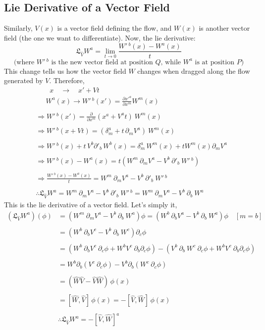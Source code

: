 \documentclass[14pt]{article} %
\begin{document}
\subsection{Lie Derivative of a Vector Field}
Similarly, $V(x)$ is a vector field defining the flow, and $W(x)$ is another vector field (the one we want to differentiate). Now, the lie derivative:
\[
\mathfrak{L}_{\hat{V}} W^a = \lim_{t \to 0} \frac{W'\,^b(x) - W^a(x)}{t}
\]
\[
\text{(where $W'\,^b$ is the new vector field at position $Q$, while $W^a$ is at position $P$)}
\]
This change tells us how the vector field $W$ changes when dragged along the flow generated by $V$. Therefore,
\begin{align*}
& \quad \quad x \quad \rightarrow \quad x' + Vt \\
& \quad ~~W^a(x) \rightarrow W'\,^b(x') = \frac{\partial x'^a}{\partial x^m} W^m(x) \\\\
& \Rightarrow W'\,^b(x') = \frac{\partial}{\partial x^m}(x^a + V^a t)~W^m(x) \\\\
& \Rightarrow W'\,^b(x + Vt) = \left( \delta^a_m + t\,\partial_m V^a \right)~W^m(x) \\\\
& \Rightarrow W'\,^b(x)+ t\,V^b \partial'_b\,W^b(x) = \delta^a_m\,W^m(x) + t W^m(x) \partial_m V^a \\\\
& \Rightarrow W'\,^b(x) - W^a(x) = t \left(W^m~\partial_m V^a - V^b~ \partial'_b ~W'\,^b \right) \\\\
& \Rightarrow \frac{W'\,^b(x) - W^a(x)}{t} = W^m~\partial_m V^a - V^b~ \partial'_b ~W'\,^b \\\\
&  \boxed{\therefore \mathfrak{L}_{\hat{V}} W^a = W^m~\partial_m V^a - V^b~ \partial'_b ~W'\,^b = W^m~\partial_m V^a - V^b~ \partial_b ~W^a}
\end{align*}
This is the lie derivative of a vector field. Let's simply it,
\begin{align*}
(\mathfrak{L}_{\hat{V}} W^a)(\phi) & = (W^m~\partial_m V^a - V^b~ \partial_b ~W^a)\phi= (W^b~\partial_b V^a - V^b~ \partial_b ~W^a) \phi \quad[m=b] \\\\
& = (W^b~\partial_b V^c - V^b~ \partial_b ~W^c) \partial_c \phi \\\\
&= (W^b~\partial_b V^c ~\partial_c \phi + W^b V^c~\partial_b \partial_c \phi) - (V^b~ \partial_b ~W^c~\partial_c \phi + W^b V^c~\partial_b \partial_c \phi) \\\\
&= W^b \partial_b (V^c ~ \partial_c \phi) - V^b \partial_b (W^c ~ \partial_c \phi) \\\\
& = ( \hat{W} \hat{V} - \hat{V} \hat{W})\, \phi(x) \\\\
& =[ \hat{W}, \hat{V} ]\, \phi(x) = -[ \hat{V}, \hat{W} ]\, \phi(x)\\\\
& \boxed{\therefore \mathfrak{L}_{\hat{V}} W^a = -[\hat{V}, \hat{W}]^a}
\end{align*}
\end{document}
